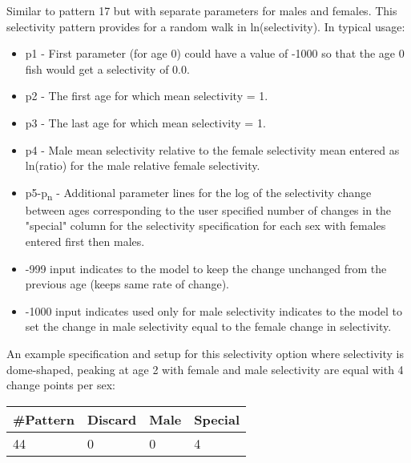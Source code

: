 Similar to pattern 17 but with separate parameters for males and females. This selectivity pattern provides for a random walk in ln(selectivity).  In typical usage:
	\begin{itemize}
		\item p1 - First parameter (for age 0) could have a value of -1000 so that the age 0 fish would get a selectivity of 0.0.
		\item p2 - The first age for which mean selectivity = 1.
		\item p3 - The last age for which mean selectivity = 1.
		\item p4 - Male mean selectivity relative to the female selectivity mean entered as ln(ratio) for the male relative female selectivity.
		\item p5-p\textsubscript{n} - Additional parameter lines for the log of the selectivity change between ages corresponding to the user specified number of changes in the "special" column for the selectivity specification for each sex with females entered first then males.
		\item -999 input indicates to the model to keep the change unchanged from the previous age (keeps same rate of change).
		\item -1000 input indicates used only for male selectivity indicates to the model to set the change in male selectivity equal to the female change in selectivity.
	\end{itemize}
	
An example specification and setup for this selectivity option where selectivity is dome-shaped, peaking at age 2 with female and male selectivity are equal with 4 change points per sex:
	\begin{center}
		\begin{longtable}{p{1.5cm} p{1.5cm} p{1.5cm} p{1.5cm} }
			\hline
			\#Pattern & Discard & Male & Special\Tstrut\Bstrut\\
			\hline
			44 & 0 & 0 & 4 \Tstrut\Bstrut\\
			\hline
		\end{longtable}
	\end{center}

